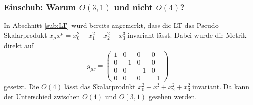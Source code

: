 \documentclass[
  captions=tableheading,  %
  titlepage=firstiscover, %
]{scrartcl}
\begin{document}
\subsubsection{Einschub: Warum \texorpdfstring{$O(3,1)$}{PDFstring} und nicht \texorpdfstring{$O(4)$}{PDFstring}?}
In Abschnitt \ref{sub:LT} wurd bereits angemerkt, dass die LT das Pseudo-Skalarprodukt $x_{\mu}x^{\mu} = x_0^2 - x_1^2 - x_2^2 - x_3^3$
invariant lässt.
Dabei wurde die Metrik direkt auf 
\begin{equation*}
  g_{\mu \nu} = 
  \begin{pmatrix}
    1 & 0   & 0   & 0 \\
    0 & -1  & 0   & 0 \\
    0 & 0   & -1  & 0 \\
    0 & 0   & 0   & -1 
  \end{pmatrix}
\end{equation*}
gesetzt. 
Die $O(4)$ lässt das Skalarprodukt $x_0^2 + x_1^2 + x_2^2 + x_3^2$ invariant.
Da kann der Unterschied zwischen $O(4)$ und $O(3,1)$ gesehen werden.
\end{document}
